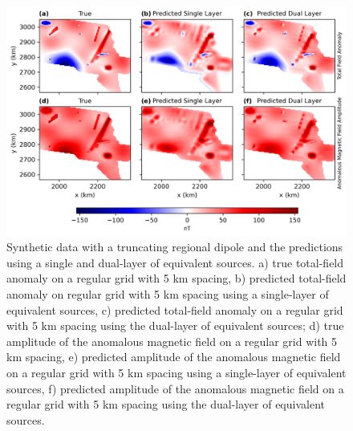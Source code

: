 \begin{figure}[tb!]
\centering
\includegraphics[width=1\linewidth]{figures/truncated_regional.png}
\caption{
    Synthetic data with a truncating regional dipole and the predictions using a single and dual-layer of equivalent sources. a) true total-field anomaly on a regular grid with 5 km spacing, b) predicted total-field anomaly on regular grid with 5 km spacing using a single-layer of equivalent sources, c) predicted total-field anomaly on a regular grid with 5 km spacing using the dual-layer of equivalent sources; d) true amplitude of the anomalous magnetic field on a regular grid with 5 km spacing, e) predicted amplitude of the anomalous magnetic field on a regular grid with 5 km spacing using a single-layer of equivalent sources, f) predicted amplitude of the anomalous magnetic field on a regular grid with 5 km spacing using the dual-layer of equivalent sources.
}
\label{fig:truncated_regional}
\end{figure}

